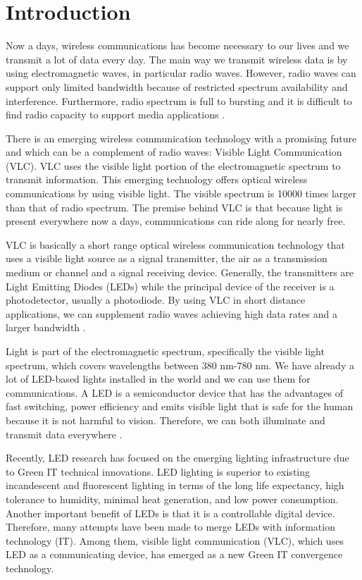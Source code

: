 \chapter{Introduction}
\label{ChapterIntroduction}
%
Now a days, wireless communications has become necessary to our lives and we transmit a lot of data every day. The main way we transmit wireless data is by using electromagnetic waves, in particular radio waves. However, radio waves can support only limited bandwidth because of restricted spectrum availability and interference. Furthermore, radio spectrum is full to bursting and it is difficult to find radio capacity to support media applications \cite{r3}.

There is an emerging wireless communication technology with a promising future and which can be a complement of radio waves: Visible Light Communication (VLC). VLC uses the visible light portion of the electromagnetic spectrum to transmit information. This emerging technology offers optical wireless communications by using visible light. The visible spectrum is 10000 times larger than that of radio spectrum. The premise behind VLC is that because light is present everywhere now a days, communications can ride along for nearly free.

VLC is basically a short range optical wireless communication technology that uses a visible light source as a signal transmitter, the air as a transmission medium or channel and a signal receiving device. Generally, the transmitters are Light Emitting Diodes (LEDs) while the principal device of the receiver is a photodetector, usually a photodiode. By using VLC in short distance applications, we can supplement radio waves achieving high data rates and a larger bandwidth \cite{r1}.

Light is part of the electromagnetic spectrum, specifically the visible light spectrum, which covers wavelengths between 380 nm-780 nm. We have already a lot of LED-based lights installed in the world and we can use them for communications. A LED is a semiconductor device that has the advantages of fast switching, power efficiency and emits visible light that is safe for the human because it is not harmful to vision. Therefore, we can both illuminate and transmit data everywhere \cite{r1}.

Recently, LED research has focused on the emerging lighting infrastructure due to Green IT technical innovations. LED lighting is superior to existing incandescent and fluorescent lighting in terms of the long life expectancy, high tolerance to humidity, minimal heat generation, and low power consumption. Another important benefit of LEDs is that it is a controllable digital device. Therefore, many attempts have been made to merge LEDs with information technology (IT). Among them, visible light communication (VLC), which uses LED as a communicating device, has emerged as a new Green IT convergence technology.

